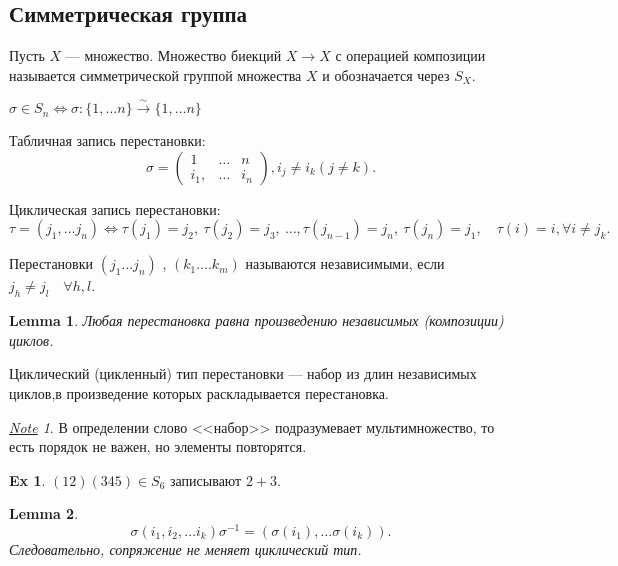 \documentclass[11pt]{book}
\theoremstyle{definition}
\theoremstyle{plain}
\theoremstyle{plain}
\newtheorem{lm}{Lemma}
\theoremstyle{definition}
\newtheorem*{ex}{Ex}
\theoremstyle{remark}
\newtheorem*{note}{\underline{Note}}
\begin{document}
\subsection{Симметрическая группа}
\begin{defn}
    Пусть $ X$ --- множество. Множество биекций  $ X \to  X$ с операцией композиции называется {симметрической группой} множества $ X$ и обозначается через  $ S_X$.
\end{defn}
\begin{defn}[Перестановка]
    $\sigma \in  S_n \Longleftrightarrow \sigma : \{1, \ldots n \} \stackrel{\sim} \to  \{1, \ldots n\}$
    \begin{description}
	\item
	    Табличная запись перестановки:
	    \[
		\sigma  = \left (
		    \begin{array}{ccc}
			1 &\ldots& n \\
			i_1, & \ldots  & i_n
		    \end{array}
		\right ), i_j \ne i_k (j \ne k)
	    .\]
	\item Циклическая запись перестановки:
	    \[
		\tau = (j_1, \ldots j_n) \Longleftrightarrow
		\tau(j_1) = j_2, ~ \tau(j_2) = j_3, ~ \ldots , \tau(j_{n-1}) = j_n, ~ \tau(j_n) = j_1, \quad \tau(i) = i, \forall i \ne j_k
	    .\]
    \end{description}
\end{defn}
\begin{defn}
    Перестановки     $(j_1 \ldots j_n)$ , $(k_1 \ldots .k_m)$ называются  {\sf независимыми}, если $j_h \ne j_l \quad \forall h, l$.
\end{defn}
\begin{lm}
    Любая перестановка равна произведению независимых (композиции) циклов.
\end{lm}
\begin{defn}
    {\sf Циклический (цикленный) тип перестановки} --- набор из длин независимых циклов,в произведение которых раскладывается перестановка.
\end{defn}
\begin{note}
    В определении слово <<набор>> подразумевает мультимножество, то есть порядок не важен, но элементы повторятся.
\end{note}
\begin{ex}
    $(12) (345) \in  S_6$ записывают $2 + 3$.
\end{ex}
\begin{lm}\label{lm_sim_group_1}
    \[
	\sigma (i_1, i_2, \ldots i_k) \sigma ^{-1} = ( \sigma (i_1), \ldots \sigma (i_k))
    .\]
    Следовательно, сопряжение не меняет циклический тип.
\end{lm}
\end{document}
